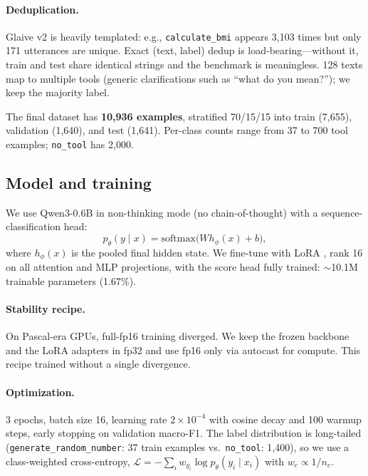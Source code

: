 \documentclass{article}
\begin{document}
\paragraph{Deduplication.} Glaive v2 is heavily templated: e.g.,
\texttt{calculate\_bmi} appears 3,103 times but only 171 utterances are
unique. Exact (text, label) dedup is load-bearing---without it, train and
test share identical strings and the benchmark is meaningless. 128 texts map
to multiple tools (generic clarifications such as ``what do you mean?'');
we keep the majority label.

The final dataset has \textbf{10,936 examples}, stratified 70/15/15 into
train (7,655), validation (1,640), and test (1,641). Per-class counts range
from 37 to 700 tool examples; \texttt{no\_tool} has 2,000.

\subsection{Model and training}
\label{sec:model}

We use Qwen3-0.6B \citep{qwen2025report} in non-thinking mode (no
chain-of-thought) with a sequence-classification head:
\begin{equation}
  p_\theta(y \mid x) = \mathrm{softmax}\bigl(W h_\phi(x) + b\bigr),
\end{equation}
where $h_\phi(x)$ is the pooled final hidden state. We fine-tune with LoRA
\citep{hu2022lora}, rank 16 on all attention and MLP projections, with the
score head fully trained: $\sim$10.1M trainable parameters (1.67\%).

\paragraph{Stability recipe.} On Pascal-era GPUs, full-fp16 training diverged.
We keep the frozen backbone and the LoRA adapters in fp32 and use fp16 only
via autocast for compute. This recipe trained without a single divergence.

\paragraph{Optimization.} 3 epochs, batch size 16, learning rate $2\times
10^{-4}$ with cosine decay and 100 warmup steps, early stopping on validation
macro-F1. The label distribution is long-tailed
(\texttt{generate\_random\_number}: 37 train examples vs.\ \texttt{no\_tool}:
1,400), so we use a class-weighted cross-entropy,
$\mathcal{L} = -\sum_i w_{y_i} \log p_\theta(y_i \mid x_i)$ with
$w_c \propto 1/n_c$.
\end{document}
